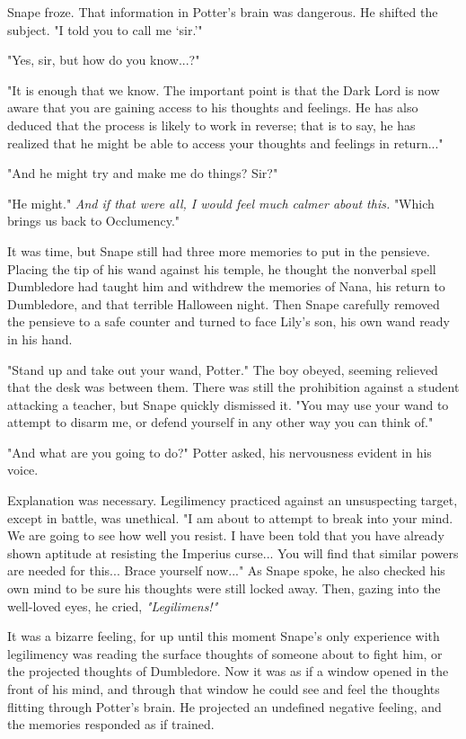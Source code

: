 \documentclass[a4paper,11pt]{article}
\begin{document}
Snape froze. That information in Potter's brain was dangerous. He shifted the subject. "I told you to call me `sir.'"

"Yes, sir, but how do you know...?"

"It is enough that we know. The important point is that the Dark Lord is now aware that you are gaining access to his thoughts and feelings. He has also deduced that the process is likely to work in reverse; that is to say, he has realized that he might be able to access your thoughts and feelings in return..."

"And he might try and make me do things? Sir?"

"He might." \emph{And if that were all, I would feel much calmer about this.} "Which brings us back to Occlumency."

It was time, but Snape still had three more memories to put in the pensieve. Placing the tip of his wand against his temple, he thought the nonverbal spell Dumbledore had taught him and withdrew the memories of Nana, his return to Dumbledore, and that terrible Halloween night. Then Snape carefully removed the pensieve to a safe counter and turned to face Lily's son, his own wand ready in his hand.

"Stand up and take out your wand, Potter." The boy obeyed, seeming relieved that the desk was between them. There was still the prohibition against a student attacking a teacher, but Snape quickly dismissed it. "You may use your wand to attempt to disarm me, or defend yourself in any other way you can think of."

"And what are you going to do?" Potter asked, his nervousness evident in his voice.

Explanation was necessary. Legilimency practiced against an unsuspecting target, except in battle, was unethical. "I am about to attempt to break into your mind. We are going to see how well you resist. I have been told that you have already shown aptitude at resisting the Imperius curse... You will find that similar powers are needed for this... Brace yourself now..." As Snape spoke, he also checked his own mind to be sure his thoughts were still locked away. Then, gazing into the well-loved eyes, he cried, \emph{"Legilimens!"}

It was a bizarre feeling, for up until this moment Snape's only experience with legilimency was reading the surface thoughts of someone about to fight him, or the projected thoughts of Dumbledore. Now it was as if a window opened in the front of his mind, and through that window he could see and feel the thoughts flitting through Potter's brain. He projected an undefined negative feeling, and the memories responded as if trained.
\end{document}
